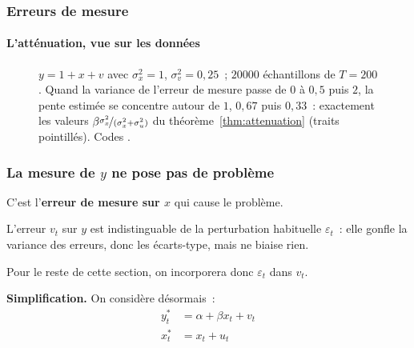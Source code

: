 \documentclass[10pt]{beamer}
\begin{document}
\begin{frame}[c]
  \frametitle{Erreurs de mesure}
  \framesubtitle{L'atténuation, vue sur les données}

  \begin{figure}
    \centering
    \scalebox{.42}{}
    \caption{$y=1+x+v$ avec $\sigma_x^2=1$, $\sigma_v^2=0{,}25$~; $20000$
      échantillons de $T=200$. Quand la variance de l'erreur de mesure passe
      de $0$ à $0{,}5$ puis $2$, la pente estimée se concentre autour
      de $1$, $0{,}67$ puis $0{,}33$~: exactement les valeurs
      $\beta\nicefrac{\sigma_x^2}{(\sigma_x^2+\sigma_u^2)}$ du
      théorème~\ref{thm:attenuation} (traits pointillés). Codes
      .}
  \end{figure}

\end{frame}


\begin{frame}
  \frametitle{La mesure de $y$ ne pose pas de problème}

  \begin{rem}{}
    C'est l'\textbf{erreur de mesure sur $x$} qui cause le problème.

    L'erreur $v_t$ sur $y$ est indistinguable de la perturbation
    habituelle $\varepsilon_t$~: elle gonfle la variance des erreurs, donc les
    écarts-type, mais ne biaise rien.

    Pour le reste de cette section, on incorporera donc $\varepsilon_t$
    dans $v_t$.
  \end{rem}

  \bigskip

  \textbf{Simplification.} On considère désormais~:
  \begin{align*}
    y_t^* &= \alpha + \beta x_t + v_t \\
    x_t^* &= x_t + u_t
  \end{align*}

\end{frame}
\end{document}

